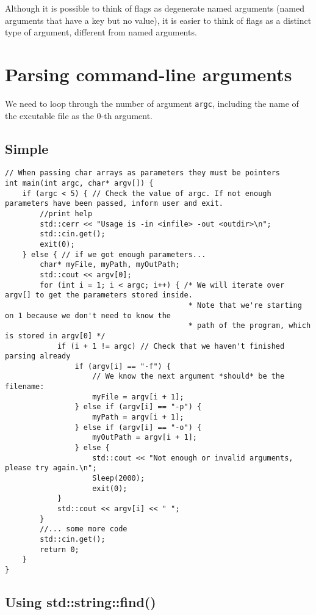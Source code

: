 Although it is possible to think of flags as degenerate named arguments (named
arguments that have a key but no value), it is easier to think of flags as a
distinct type of argument, different from named arguments.


\section{Parsing command-line arguments}

We need to loop through the number of argument \verb!argc!, including the name
of the excutable file as the 0-th argument. 

\subsection{Simple}


{\small 
\begin{verbatim}
// When passing char arrays as parameters they must be pointers
int main(int argc, char* argv[]) {
    if (argc < 5) { // Check the value of argc. If not enough parameters have been passed, inform user and exit.
        //print help
        std::cerr << "Usage is -in <infile> -out <outdir>\n"; 
        std::cin.get();
        exit(0);
    } else { // if we got enough parameters...
        char* myFile, myPath, myOutPath;
        std::cout << argv[0];
        for (int i = 1; i < argc; i++) { /* We will iterate over argv[] to get the parameters stored inside.
                                          * Note that we're starting on 1 because we don't need to know the 
                                          * path of the program, which is stored in argv[0] */
            if (i + 1 != argc) // Check that we haven't finished parsing already
                if (argv[i] == "-f") {
                    // We know the next argument *should* be the filename:
                    myFile = argv[i + 1];
                } else if (argv[i] == "-p") {
                    myPath = argv[i + 1];
                } else if (argv[i] == "-o") {
                    myOutPath = argv[i + 1];
                } else {
                    std::cout << "Not enough or invalid arguments, please try again.\n";
                    Sleep(2000); 
                    exit(0);
            }
            std::cout << argv[i] << " ";
        }
        //... some more code
        std::cin.get();
        return 0;
    }
}
\end{verbatim}
}

\subsection{Using std::string::find()}

